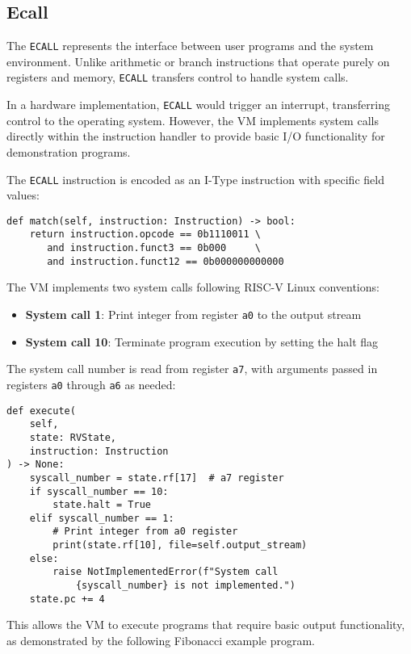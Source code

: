 \documentclass[sigconf]{acmart}
\begin{document}
\subsection{Ecall}
The \texttt{ECALL} represents the interface between user programs and the system environment. Unlike arithmetic or branch instructions that operate purely on registers and memory, \texttt{ECALL} transfers control to handle system calls.

In a hardware implementation, \texttt{ECALL} would trigger an interrupt, transferring control to the operating system. However, the VM implements system calls directly within the instruction handler to provide basic I/O functionality for demonstration programs.

The \texttt{ECALL} instruction is encoded as an I-Type instruction with specific field values:
\begin{verbatim}
def match(self, instruction: Instruction) -> bool:
    return instruction.opcode == 0b1110011 \
       and instruction.funct3 == 0b000     \
       and instruction.funct12 == 0b000000000000
\end{verbatim}

The VM implements two system calls following RISC-V Linux conventions:
\begin{itemize}
    \item \textbf{System call 1}: Print integer from register \texttt{a0} to the output stream
    \item \textbf{System call 10}: Terminate program execution by setting the halt flag
\end{itemize}

The system call number is read from register \texttt{a7}, with arguments passed in registers \texttt{a0} through \texttt{a6} as needed:
\begin{verbatim}
def execute(
    self, 
    state: RVState, 
    instruction: Instruction
) -> None:
    syscall_number = state.rf[17]  # a7 register
    if syscall_number == 10:
        state.halt = True
    elif syscall_number == 1:
        # Print integer from a0 register
        print(state.rf[10], file=self.output_stream)
    else:
        raise NotImplementedError(f"System call 
            {syscall_number} is not implemented.")
    state.pc += 4
\end{verbatim}

This allows the VM to execute programs that require basic output functionality, as demonstrated by the following Fibonacci example program.
\end{document}
